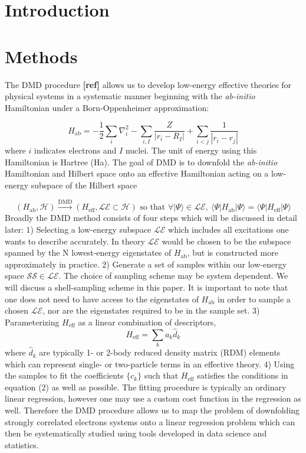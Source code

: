 \documentclass{article}
\begin{document}
\section{Introduction}

\section{Methods}
The DMD procedure \textbf{[ref]} allows us to develop low-energy effective theories for physical systems in a systematic manner beginning with the \textit{ab-initio} Hamiltonian under a Born-Oppenheimer approximation:

\begin{equation}
H_\text{ab} = -\frac{1}{2} \sum_{i} \nabla_i^2 - \sum_{i,I}\frac{Z}{|r_i - R_I|} + \sum_{i<j}\frac{1}{|r_i - r_j|}
\end{equation}
where $i$ indicates electrons and $I$ nuclei. 
The unit of energy using this Hamiltonian is Hartree (Ha). 
The goal of DMD is to downfold the \textit{ab-initio} Hamiltonian and Hilbert space onto an effective Hamiltonian acting on a low-energy subspace of the Hilbert space 

\begin{equation}
(H_\text{ab}, \mathcal{H}) \xrightarrow{\text{DMD}} (H_\text{eff}, \mathcal{LE} \subset \mathcal{H}) \text{ so that }
\forall |\Psi\rangle \in \mathcal{LE}, \ \langle \Psi | H_\text{ab} | \Psi\rangle = \langle \Psi | H_\text{eff} | \Psi\rangle
\end{equation} 
Broadly the DMD method consists of four steps which will be discussed in detail later: 1) Selecting a low-energy subspace $\mathcal{LE}$ which includes all excitations one wants to describe accurately. 
In theory $\mathcal{LE}$ would be chosen to be the subspace spanned by the N lowest-energy eigenstates of $H_\text{ab}$, but is constructed more approximately in practice.  
2) Generate a set of samples within our low-energy space $\mathcal{SS} \in \mathcal{LE}$. 
The choice of sampling scheme may be system dependent. 
We will discuss a shell-sampling scheme in this paper. 
It is important to note that one does not need to have access to the eigenstates of $H_\text{ab}$ in order to sample a chosen $\mathcal{LE}$, nor are the eigenstates required to be in the sample set.
3) Parameterizing $H_\text{eff}$ as a linear combination of descriptors, 
\begin{equation}
H_\text{eff} = \sum_k a_k \hat{d}_k
\end{equation}
where $\hat{d}_k$ are typically 1- or 2-body reduced density matrix (RDM) elements which can represent single- or two-particle terms in an effective theory.
4) Using the samples to fit the coefficients $\{c_k\}$ such that $H_\text{eff}$ satisfies the conditions in equation (2) as well as possible. 
The fitting procedure is typically an ordinary linear regression, however one may use a custom cost function in the regression as well. 
Therefore the DMD procedure allows us to map the problem of downfolding strongly correlated electrons systems onto a linear regression problem which can then be systematically studied using tools developed in data science and statistics.
\end{document}
